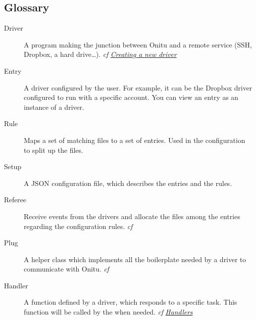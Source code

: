 \documentclass[letterpaper,10pt,english]{sphinxmanual}
\begin{document}
\subsection{Glossary}
\label{intro:glossary}\begin{description}
\item[{Driver}] \leavevmode{}\label{intro:term-driver}
A program making the junction between Onitu and a remote service (SSH, Dropbox, a hard drive…). \emph{cf} {\hyperref[drivers::doc]{\emph{Creating a new driver}}}

\item[{Entry}] \leavevmode{}\label{intro:term-entry}
A driver configured by the user. For example, it can be the Dropbox driver configured to run with a specific account. You can view an entry as an instance of a driver.

\item[{Rule}] \leavevmode{}\label{intro:term-rule}
Maps a set of matching files to a set of entries. Used in the configuration to split up the files.

\item[{Setup}] \leavevmode{}\label{intro:term-setup}
A JSON configuration file, which describes the entries and the rules.

\item[{Referee}] \leavevmode{}\label{intro:term-referee}
Receive events from the drivers and allocate the files among the entries regarding the configuration rules. \emph{cf} {\hyperref[components:onitu.referee.Referee]{}}

\item[{Plug}] \leavevmode{}\label{intro:term-plug}
A helper class which implements all the boilerplate needed by a driver to communicate with Onitu. \emph{cf} {\hyperref[drivers:onitu.api.Plug]{}}

\item[{Handler}] \leavevmode{}\label{intro:term-handler}
A function defined by a driver, which responds to a specific task. This function will be called by the {\hyperref[drivers:onitu.api.Plug]{}} when needed. \emph{cf} {\hyperref[drivers:handlers]{\emph{Handlers}}}

\end{description}
\end{document}
